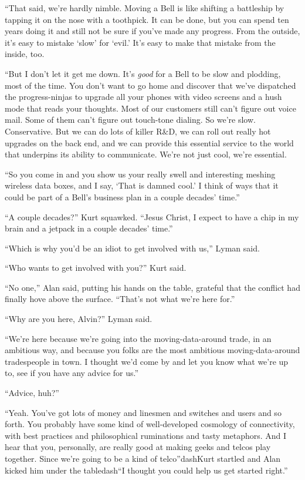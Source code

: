 ``That said, we're hardly nimble.  Moving a Bell is like shifting a
battleship by tapping it on the nose with a toothpick.  It can be
done, but you can spend ten years doing it and still not be sure if
you've made any progress.  From the outside, it's easy to mistake
`slow' for `evil.' It's easy to make that mistake from the inside,
too.

``But I don't let it get me down.  It's \textit{good} for a Bell to be
slow and plodding, most of the time.  You don't want to go home and
discover that we've dispatched the progress-ninjas to upgrade all your
phones with video screens and a hush mode that reads your thoughts. 
Most of our customers still can't figure out voice mail.  Some of them
can't figure out touch-tone dialing.  So we're slow.  Conservative. 
But we can do lots of killer R\&D, we can roll out really hot
upgrades on the back end, and we can provide this essential service to
the world that underpins its ability to communicate.  We're not just
cool, we're essential.

``So you come in and you show us your really swell and interesting
meshing wireless data boxes, and I say, `That is damned cool.' I think
of ways that it could be part of a Bell's business plan in a couple
decades' time.''

``A couple decades?'' Kurt squawked.  ``Jesus Christ, I expect to have
a chip in my brain and a jetpack in a couple decades' time.''

``Which is why you'd be an idiot to get involved with us,'' Lyman
said.

``Who wants to get involved with you?'' Kurt said.

``No one,'' Alan said, putting his hands on the table, grateful that
the conflict had finally hove above the surface.  ``That's not what
we're here for.''

``Why are you here, Alvin?'' Lyman said.

``We're here because we're going into the moving-data-around trade, in
an ambitious way, and because you folks are the most ambitious
moving-data-around tradespeople in town.  I thought we'd come by and
let you know what we're up to, see if you have any advice for us.''

``Advice, huh?''

``Yeah.  You've got lots of money and linesmen and switches and users
and so forth.  You probably have some kind of well-developed cosmology
of connectivity, with best practices and philosophical ruminations and
tasty metaphors.  And I hear that you, personally, are really good at
making geeks and telcos play together.  Since we're going to be a kind
of telco''dash{}Kurt startled and Alan kicked him under the tabledash{}``I
thought you could help us get started right.''

